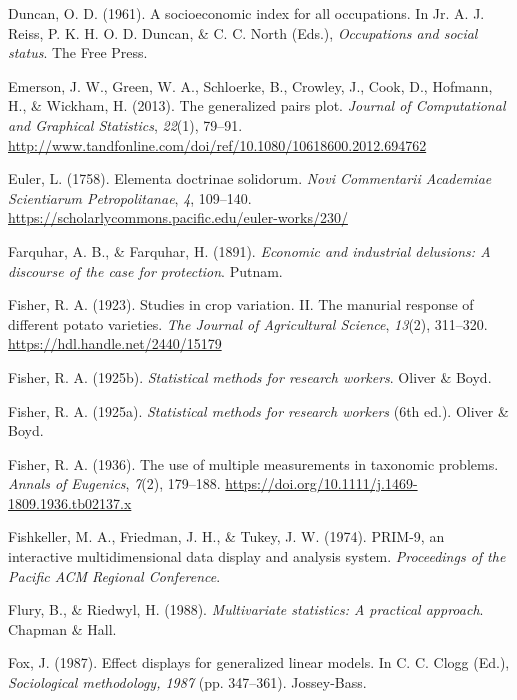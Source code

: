 \documentclass[
  letterpaper,
  10pt,
  krantz2]{krantz}
\newlength{\cslhangindent}
\newenvironment{CSLReferences}[2] %
 {\begin{list}{}{%
  \setlength{\itemindent}{0pt}
  \setlength{\leftmargin}{0pt}
  \setlength{\parsep}{0pt}
  \ifodd #1
   \setlength{\leftmargin}{\cslhangindent}
   \setlength{\itemindent}{-1\cslhangindent}
  \fi
  \setlength{\itemsep}{#2\baselineskip}}}
 {\end{list}}
\begin{document}
{\begin{CSLReferences}{1}{0}
Duncan, O. D. (1961). A socioeconomic index for all occupations. In Jr.
A. J. Reiss, P. K. H. O. D. Duncan, \& C. C. North (Eds.),
\emph{Occupations and social status}. The Free Press.

Emerson, J. W., Green, W. A., Schloerke, B., Crowley, J., Cook, D.,
Hofmann, H., \& Wickham, H. (2013). The generalized pairs plot.
\emph{Journal of Computational and Graphical Statistics}, \emph{22}(1),
79--91.
\url{http://www.tandfonline.com/doi/ref/10.1080/10618600.2012.694762}

Euler, L. (1758). Elementa doctrinae solidorum. \emph{Novi Commentarii
Academiae Scientiarum Petropolitanae}, \emph{4}, 109--140.
\url{https://scholarlycommons.pacific.edu/euler-works/230/}

Farquhar, A. B., \& Farquhar, H. (1891). \emph{Economic and industrial
delusions: A discourse of the case for protection}. Putnam.

Fisher, R. A. (1923). Studies in crop variation. II. The manurial
response of different potato varieties. \emph{The Journal of
Agricultural Science}, \emph{13}(2), 311--320.
\url{https://hdl.handle.net/2440/15179}

Fisher, R. A. (1925b). \emph{Statistical methods for research workers}.
Oliver \& Boyd.

Fisher, R. A. (1925a). \emph{Statistical methods for research workers}
(6th ed.). Oliver \& Boyd.

Fisher, R. A. (1936). The use of multiple measurements in taxonomic
problems. \emph{Annals of Eugenics}, \emph{7}(2), 179--188.
\url{https://doi.org/10.1111/j.1469-1809.1936.tb02137.x}

Fishkeller, M. A., Friedman, J. H., \& Tukey, J. W. (1974). {PRIM-9}, an
interactive multidimensional data display and analysis system.
\emph{Proceedings of the Pacific ACM Regional Conference}.

Flury, B., \& Riedwyl, H. (1988). \emph{Multivariate statistics: A
practical approach}. Chapman \& Hall.

Fox, J. (1987). Effect displays for generalized linear models. In C. C.
Clogg (Ed.), \emph{Sociological methodology, 1987} (pp. 347--361).
Jossey-Bass.


\end{CSLReferences}}
\end{document}
